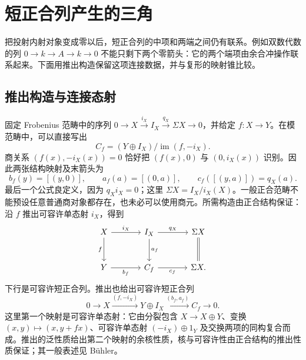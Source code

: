 
\section{短正合列产生的三角}
\label{b4:sec:D03}

把投射内射对象变成零以后，短正合列的中项和两端之间仍有联系。例如双数代数的列 \(0\to k\to A\to k\to0\) 不能只剩下两个零箭头：它的两个端项由余合冲操作联系起来。下面用推出构造保留这项连接数据，并与复形的映射锥比较。

\subsection{推出构造与连接态射}
\label{b4:subsec:D03:01}

固定 Frobenius 范畴中的序列 \(0\to X\xrightarrow{i_X}I_X\xrightarrow{q_X}\Sigma X\to0\)，并给定 \(f:X\to Y\)。在模范畴中，可以直接写出
\[
	C_f=(Y\oplus I_X)/\operatorname{im}(f,-i_X).
\]
商关系 \((f(x),-i_X(x))=0\) 恰好把 \((f(x),0)\) 与 \((0,i_X(x))\) 识别。因此两张结构映射及末箭头为
\[
	b_f(y)=[(y,0)],\qquad a_f(a)=[(0,a)],\qquad c_f([(y,a)])=q_X(a).
\]
最后一个公式良定义，因为 \(q_Xi_X=0\)；这里 \(\Sigma X=I_X/i_X(X)\)。一般正合范畴不能预设任意普通商对象都存在，也未必可以使用商元。所需构造由正合结构保证：沿 \(f\) 推出可容许单态射 \(i_X\)，得到
\begin{equation}\label{b4:eq:D-standard-pushout}
	\begin{tikzcd}[column sep=large,row sep=large]
		X\arrow[r,"i_X"]\arrow[d,"f"']&I_X\arrow[r,"q_X"]\arrow[d,"a_f"]&\Sigma X\arrow[d,equal]\\
		Y\arrow[r,"b_f"']&C_f\arrow[r,"c_f"']&\Sigma X.
	\end{tikzcd}
\end{equation}
下行是可容许短正合列。推出也给出可容许短正合列
\begin{equation}\label{b4:eq:D-graph-inflation}
	0\longrightarrow X\xrightarrow{(f,-i_X)}Y\oplus I_X \xrightarrow{(b_f,a_f)}C_f\longrightarrow0.
\end{equation}
这里第一个映射是可容许单态射：它由分裂包含 \(X\to X\oplus Y\)、变换 \((x,y)\mapsto(x,y+fx)\)、可容许单态射 \((-i_X)\oplus1_Y\) 及交换两项的同构复合而成。推出的泛性质给出第二个映射的余核性质，核与可容许性由正合结构的推出性质保证；其一般表述见 Bühler\cite[Proposition 2.12]{Buehler2010ExactCategories}。

